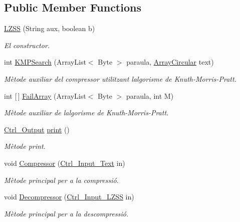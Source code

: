 \subsection*{Public Member Functions}
\begin{DoxyCompactItemize}
\item 
\hyperlink{classdomini_1_1algorithm_1_1LZSS_a991f29ccc89ecbb5645ea8f123205e20}{L\+Z\+SS} (String aux, boolean b)
\begin{DoxyCompactList}\small\item\em El constructor. \end{DoxyCompactList}\item 
int \hyperlink{classdomini_1_1algorithm_1_1LZSS_a88e88f2bb6e984cadf48e1c71f0234fc}{K\+M\+P\+Search} (Array\+List$<$ Byte $>$ paraula, \hyperlink{classdomini_1_1utils_1_1ArrayCircular}{Array\+Circular} text)
\begin{DoxyCompactList}\small\item\em Mètode auxiliar del compressor utilitzant l\textquotesingle{}algorisme de Knuth-\/\+Morris-\/\+Pratt. \end{DoxyCompactList}\item 
int \mbox{[}$\,$\mbox{]} \hyperlink{classdomini_1_1algorithm_1_1LZSS_a56733a42f84d7a58cc5db9ea5f67835f}{Fail\+Array} (Array\+List$<$ Byte $>$ paraula, int M)
\begin{DoxyCompactList}\small\item\em Mètode auxiliar de l\textquotesingle{}algorisme de Knuth-\/\+Morris-\/\+Pratt. \end{DoxyCompactList}\item 
\hyperlink{classpersistencia_1_1output_1_1Ctrl__Output}{Ctrl\+\_\+\+Output} \hyperlink{classdomini_1_1algorithm_1_1LZSS_a8172ff7c8aefb87c90c648bc1b6b78b9}{print} ()
\begin{DoxyCompactList}\small\item\em Mètode print. \end{DoxyCompactList}\item 
void \hyperlink{classdomini_1_1algorithm_1_1LZSS_a385d06ea406b7a0f1168370e9574531a}{Compressor} (\hyperlink{classpersistencia_1_1input_1_1Ctrl__Input__Text}{Ctrl\+\_\+\+Input\+\_\+\+Text} in)
\begin{DoxyCompactList}\small\item\em Mètode principal per a la compressió. \end{DoxyCompactList}\item 
void \hyperlink{classdomini_1_1algorithm_1_1LZSS_a3fcf941d4301a4a857c585b3770a0ecf}{Decompressor} (\hyperlink{classpersistencia_1_1input_1_1Ctrl__Input__LZSS}{Ctrl\+\_\+\+Input\+\_\+\+L\+Z\+SS} in)
\begin{DoxyCompactList}\small\item\em Mètode principal per a la descompressió. \end{DoxyCompactList}\end{DoxyCompactItemize}
